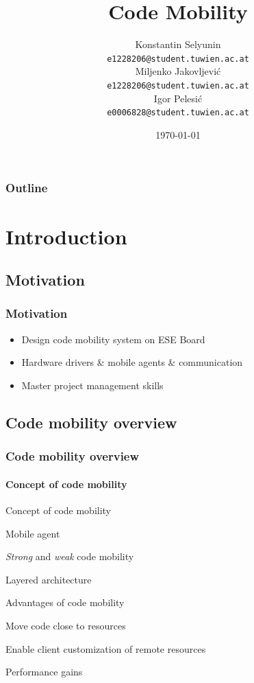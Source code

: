 \documentclass{beamer}
\title[Code Mobility]{Code Mobility}
\date{\today}
\author[Jakovljevi\'c,Selyunin,Pelesi\'c]{
 \Large{Konstantin Selyunin}\\
  \small{\texttt{e1228206@student.tuwien.ac.at}}\\
 \Large{Miljenko Jakovljevi\'c}\\
  \small{\texttt{e1228206@student.tuwien.ac.at}}\\
  \Large{Igor Pelesi\'c}\\
  \small{\texttt{e0006828@student.tuwien.ac.at}}\\
}
\theoremstyle{definition} \newtheorem{mdefinition}{Definition}
\theoremstyle{plain} \newtheorem{mtheorem}{Theorem}
\theoremstyle{plain} \newtheorem{mcorollary}{Corollary}
\theoremstyle{plain} \newtheorem{mfact}{Fact}
\begin{document}
\begin{frame}
	\titlepage
\end{frame}

\begin{frame}
	\frametitle{Outline}
	\tableofcontents
\end{frame}

\section{Introduction}
\subsection{Motivation}
\begin{frame}[fragile]
	\frametitle{Motivation}
	\begin{itemize}
		\item Design code mobility system on ESE Board
		\item Hardware drivers \& mobile agents \& communication
		\item Master project management skills
	\end{itemize}
\end{frame}

\subsection{Code mobility overview}
\begin{frame}
	\frametitle{Code mobility overview}
 		\framesubtitle{Concept of code mobility}
	\begin{block}{Concept of code mobility}
		\begin{description}
			\item	Mobile agent
			\item	{\it Strong} and {\it weak} code mobility
			\item   Layered architecture
		\end{description}
	\end{block}

	\begin{block}{Advantages of code mobility}
		\begin{description}
			\item	Move code close to resources 
			\item	Enable client customization of remote resources
			\item	Performance gains
		\end{description}
	\end{block}	

\end{frame}
\end{document}
